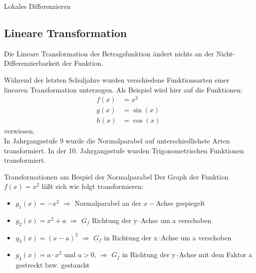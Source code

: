 \begin{section}{Lokales Differenzieren}
\subsection{Lineare Transformation}
\begin{bem*}{}
Die Lineare Transformation der Betragsfunktion ändert nichts an der Nicht-Differenzierbarkeit der Funktion.
\end{bem*}
Während der letzten Schuljahre wurden verschiedene Funktionsarten einer linearen Transformation unterzogen. Als Beispiel wird hier auf die Funktionen: 
 \begin{equation*}
    \begin{split}
        f(x) &= x^2\\
        g(x) &= \sin{(x)}\\
        h(x) &= \cos{(x)}
    \end{split}
\end{equation*}
verwiesen.\\ 
In Jahrgangsstufe 9 wurde die Normalparabel auf unterschiedlichste Arten transformiert. In der 10. Jahrgangsstufe wurden Trigonometrischen Funktionen transformiert.
\begin{bsp*}{Transformationen am Bespiel der Normalparabel}{}
Der Graph der Funktion $f(x) = x^2$ läßt sich wie folgt transformieren:
\begin{itemize}
\item $g_1(x) = -x^2$ $\Longrightarrow$ Normalparabel an der $x-$Achse gespiegelt
\item $g_2(x) =   x^2 +a$ $\Longrightarrow$ $G_f$  Richtung der y--Achse um a verschoben
\item $g_3(x) =(x-a)^2$ $\Longrightarrow$ $G_f$ in Richtung der x--Achse um a verschoben
\item $g_4(x) =a\cdot x^2$ und $a>0$, $\Longrightarrow$ $G_f$ in Richtung der y--Achse mit dem Faktor a gestreckt bzw. gestaucht
\end{itemize}
\end{bsp*}


\end{section}
